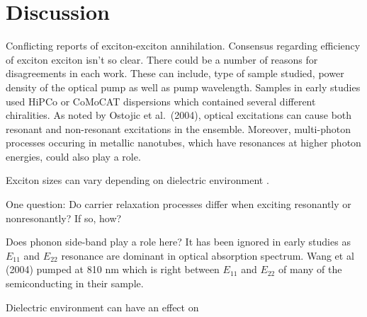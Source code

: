 \section{Discussion}


Conflicting reports of exciton-exciton annihilation. Consensus regarding efficiency of exciton exciton isn't so clear. There could be a number of reasons for disagreements in each work. These can include, type of sample studied, power density of the optical pump as well as pump wavelength. Samples in early studies used HiPCo or CoMoCAT dispersions which contained several different chiralities. As noted by Ostojic et al.\ (2004), optical excitations can cause both resonant and non-resonant excitations in the ensemble. Moreover, multi-photon processes occuring in metallic nanotubes, which have resonances at higher photon energies, could also play a role.

Exciton sizes can vary depending on dielectric environment \cite{mann201613}.

One question: Do carrier relaxation processes differ when exciting resonantly or nonresonantly? If so, how?

Does phonon side-band play a role here? It has been ignored in early studies as $E_{11}$ and $E_{22}$ resonance are dominant in optical absorption spectrum.
Wang et al (2004) pumped at 810 nm which is right between $E_{11}$ and $E_{22}$ of many of the semiconducting in their sample.

Dielectric environment can have an effect on
